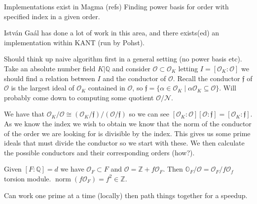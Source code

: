 \documentclass[11pt,a4paper]{article}
\begin{document}
\maketitle

Implementations exist in Magma (refs)
Finding power basis for order with specified index in a given order.

Istv\'an Ga\'al has done a lot of work in this area, and there exists(ed) an implementation within KANT (run by Pohst).

Should think up naive algorithm first in a general setting (no power basis etc).
Take an absolute number field $K|\mathbb{Q}$ and consider $\mathcal{O}\subset \mathcal{O}_K$ letting $I=[\mathcal{O}_K:\mathcal{O}]$ we should find a relation between $I$ and the conductor of $\mathcal{O}$.
Recall the conductor $\mathfrak{f}$ of $\mathcal{O}$ is the largest ideal of $\mathcal{O}_K$ contained in $\mathcal{O}$, so $\mathfrak{f} = \{\alpha\in\mathcal{O}_K\mid \alpha\mathcal{O}_K\subseteq \mathcal{O}\}$.
Will probably come down to computing some quotient $\mathcal{O}/\mathcal{N}$.

We have that $\mathcal{O}_K/\mathcal{O}\cong (\mathcal{O}_K/\mathfrak{f})/(\mathcal{O}/\mathfrak{f})$ so we can see $[\mathcal{O}_K:\mathcal{O}][\mathcal{O}:\mathfrak{f}] = [\mathcal{O}_K:\mathfrak{f}]$.
As we know the index we wish to obtain we know that the norm of the conductor of the order we are looking for is divisible by the index.
This gives us some prime ideals that must divide the conductor so we start with these.
We then calculate the possible conductors and their corresponding orders (how?).

Given $[F:\mathbb{Q}] = d$ we have $\mathcal{O}_F\subset F$ and $\mathcal{O} = \mathbb{Z} + f\mathcal{O}_F$.
Then $\mathbb{O}_F/\mathcal{O} = \mathcal{O}_F/f\mathcal{O}_f$ torsion module.
$\operatorname{norm}(f\mathcal{O}_F) = f^2 \in \mathbb{Z}$.

Can work one prime at a time (locally) then path things together for a speedup.

\nocite{*} %


\end{document}
